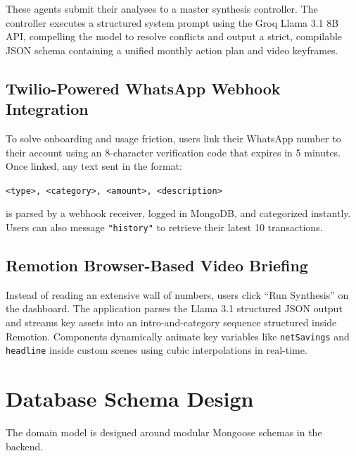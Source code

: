 \documentclass[11pt,a4paper]{article}
\begin{document}
These agents submit their analyses to a master synthesis controller. The controller executes a structured system prompt using the Groq Llama 3.1 8B API, compelling the model to resolve conflicts and output a strict, compilable JSON schema containing a unified monthly action plan and video keyframes.

\subsection{Twilio-Powered WhatsApp Webhook Integration}
To solve onboarding and usage friction, users link their WhatsApp number to their account using an 8-character verification code that expires in 5 minutes. Once linked, any text sent in the format:
\begin{center}
    \texttt{<type>, <category>, <amount>, <description>}
\end{center}
is parsed by a webhook receiver, logged in MongoDB, and categorized instantly. Users can also message \texttt{"history"} to retrieve their latest 10 transactions.

\subsection{Remotion Browser-Based Video Briefing}
Instead of reading an extensive wall of numbers, users click ``Run Synthesis'' on the dashboard. The application parses the Llama 3.1 structured JSON output and streams key assets into an intro-and-category sequence structured inside Remotion. Components dynamically animate key variables like \texttt{netSavings} and \texttt{headline} inside custom scenes using cubic interpolations in real-time.

\section{Database Schema Design}
The domain model is designed around modular Mongoose schemas in the backend. 
\end{document}
